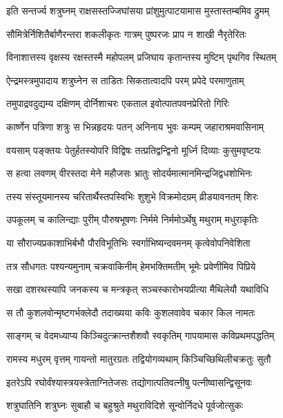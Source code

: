 \twolineshloka
{इति सन्तर्ज्य शत्रुघ्नम् राक्षसस्तज्जिघांसया}
{प्रांशुमुत्पाटयामास मुस्तास्तम्बमिव द्रुमम्} %

\twolineshloka
{सौमित्रेर्निशितैर्बाणैरन्तरा शकलीकृतः}
{गात्रम् पुष्परजः प्राप न शाखी नैरृतेरितः} %

\twolineshloka
{विनाशात्तस्य वृक्षस्य रक्षस्तस्मै महोपलम्}
{प्रजिघाय कृतान्तस्य मुष्टिम् पृथगिव स्थितम्} %

\twolineshloka
{ऐन्द्रमस्त्रमुपादाय शत्रुघ्नेन स ताडितः}
{सिकतात्वादपि परम् प्रपेदे परमाणुताम्} %

\twolineshloka
{तमुपाद्रवदुद्यम्य दक्षिणम् दोर्निशाचरः}
{एकताल इवोत्पातपवनप्रेरितो गिरिः} %

\twolineshloka
{कार्ष्णेन पत्रिणा शत्रुः स भिन्नहृदयः पतन्}
{अनिनाय भुवः कम्पम् जहाराश्रमवासिनाम्} %

\twolineshloka
{वयसाम् पङ्क्तयः पेतुर्हतस्योपरि विद्विषः}
{तत्प्रतिद्वन्द्विनो मूर्ध्नि दिव्याः कुसुमवृष्टयः} %

\twolineshloka
{स हत्वा लवणम् वीरस्तदा मेने महौजसः}
{भ्रातुः सोदर्यमात्मानमिन्द्रजिद्वधशोभिनः} %

\twolineshloka
{तस्य संस्तूयमानस्य चरितार्थैस्तपस्विभिः}
{शुशुभे विक्रमोदग्रम् व्रीडयावनतम् शिरः} %

\twolineshloka
{उपकूलम् च कालिन्द्याः पुरीम् पौरुषभूषणः}
{निर्ममे निर्ममोऽर्थेषु मथुराम् मधुराकृतिः} %

\twolineshloka
{या सौराज्यप्रकाशाभिर्बभौ पौरविभूतिभिः}
{स्वर्गाभिष्यन्दवमनम् कृत्वेवोपनिवेशिता} %

\twolineshloka
{तत्र सौधगतः पश्यन्यमुनाम् चक्रवाकिनीम्}
{हेमभक्तिमतीम् भूमेः प्रवेणीमिव पिप्रिये} %

\twolineshloka
{सखा दशरथस्यापि जनकस्य च मन्त्रकृत्}
{सञ्चस्कारोभयप्रीत्या मैथिलेयौ यथाविधि} %

\twolineshloka
{स तौ कुशलवोन्मृष्टगर्भक्लेदौ तदाख्यया}
{कविः कुशलवावेव चकार किल नामतः} %

\twolineshloka
{साङ्गम् च वेदमध्याप्य किञ्चिदुत्क्रान्तशैशवौ}
{स्वकृतिम् गापयामास कविप्रथमपद्धतिम्} %

\twolineshloka
{रामस्य मधुरम् वृत्तम् गायन्तो मातुरग्रतः}
{तद्वियोगव्यथाम् किञ्चिच्छिथिलीचक्रतुः सुतौ} %

\twolineshloka
{इतरेऽपि रघोर्वंश्यास्त्रयस्त्रेताग्नितेजसः}
{तद्योगात्पतिवत्नीषु पत्नीष्वासन्द्विसूनवः} %

\twolineshloka
{शत्रुघातिनि शत्रुघ्नः सुबाहौ च बहुश्रुते}
{मथुराविदिशे सून्वोर्निदधे पूर्वजोत्सुकः} %

